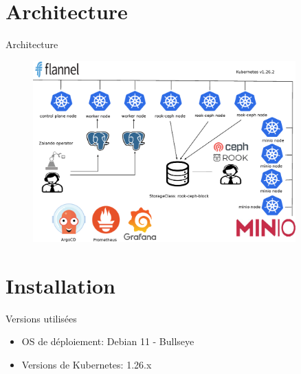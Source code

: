
\section{Architecture}


\begin{frame}[fragile]{Architecture}

\begin{figure}
\begin{center}
\includegraphics[width=0.9\textwidth, height=0.9\textheight]{images/architecture.eps}
\end{center}
\end{figure}

\end{frame}


\section{Installation}


\begin{frame}[fragile]{Versions utilisées}

   \begin{itemize}
      \item OS de déploiement: Debian 11 - Bullseye
      \item Versions de Kubernetes: 1.26.x
   \end{itemize}

\end{frame}

